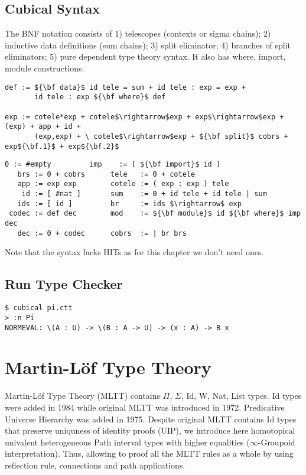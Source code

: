 \documentclass{article}
\theoremstyle{definition}
\begin{document}
\subsection*{Cubical Syntax}

The BNF notation consists of 1) telescopes (contexts or sigma chains);
2) inductive data definitions (sum chains); 3) split eliminator;
4) branches of split eliminators; 5) pure dependent type theory syntax.
It also has where, import, module constructions.

\begin{lstlisting}[mathescape=true]
def := ${\bf data}$ id tele = sum + id tele : exp = exp +
       id tele : exp ${\bf where}$ def

exp := cotele*exp + cotele$\rightarrow$exp + exp$\rightarrow$exp + (exp) + app + id +
       (exp,exp) + \ cotele$\rightarrow$exp + ${\bf split}$ cobrs + exp${\bf.1}$ + exp${\bf.2}$
\end{lstlisting}

\begin{lstlisting}[mathescape=true]
     0 := #empty         imp    := [ ${\bf import}$ id ]
   brs := 0 + cobrs      tele   := 0 + cotele
   app := exp exp        cotele := ( exp : exp ) tele
    id := [ #nat ]       sum    := 0 + id tele + id tele | sum
   ids := [ id ]         br     := ids $\rightarrow$ exp
 codec := def dec        mod    := ${\bf module}$ id ${\bf where}$ imp dec
   dec := 0 + codec      cobrs  := | br brs
\end{lstlisting}

Note that the syntax lacks HITs as for this chapter we don't need ones.

\subsection*{Run Type Checker}

\begin{lstlisting}
$ cubical pi.ctt
> :n Pi
NORMEVAL: \(A : U) -> \(B : A -> U) -> (x : A) -> B x
\end{lstlisting}

\newpage
\section{Martin-Löf Type Theory}

Martin-Löf Type Theory (MLTT) contains $\Pi$, $\Sigma$, Id, W, Nat, List types.
Id types were added in 1984 while original MLTT was introduced in 1972.
Predicative Universe Hierarchy was added in 1975.
Despite original MLTT contains Id types that preserve uniquness of identity
proofs (UIP), we introduce here homotopical univalent heterogeneous Path
interval types with higher equalities ($\infty$-Groupoid interpretation).
Thus, allowing to proof all the MLTT rules as a whole by using reflection rule, connections and path applications.
\end{document}
